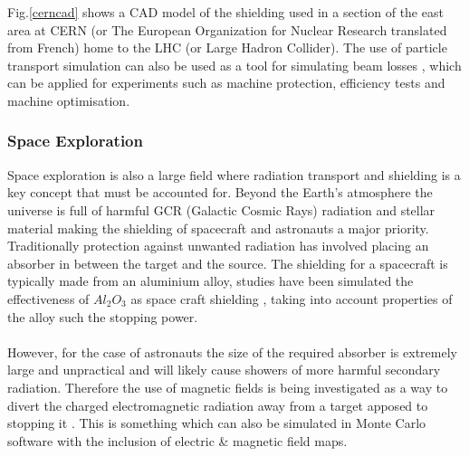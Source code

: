 \documentclass[12pt,a4paper]{article}
\begin{document}
\noindent Fig.\ref{cerncad} shows a CAD model of the shielding used in a section of the east area at CERN (or The European Organization for Nuclear Research translated from French) home to the LHC (or Large Hadron Collider). The use of particle transport simulation can also be used as a tool for simulating beam losses \cite{pyg4om}, which can be applied for experiments such as machine protection, efficiency tests and machine optimisation.

\subsubsection{Space Exploration}
\noindent Space exploration is also a large field where radiation transport and shielding is a key concept that must be accounted for. Beyond the Earth's atmosphere the universe is full of harmful GCR (Galactic Cosmic Rays) radiation and stellar material making the shielding of spacecraft and astronauts a major priority. Traditionally protection against unwanted radiation has involved placing an absorber in between the target and the source. The shielding for a spacecraft is typically made from an aluminium alloy, studies have been simulated the effectiveness of $Al_2O_3$ as space craft shielding \cite{spacesh}, taking into account properties of the alloy such the stopping power. 
\\\\
\noindent However, for the case of astronauts the size of the required absorber is extremely large and unpractical and will likely cause showers of more harmful secondary radiation. Therefore the use of magnetic fields is being investigated as a way to divert the charged electromagnetic radiation away from a target apposed to stopping it \cite{magf}. This is something which can also be simulated in Monte Carlo software with the inclusion of electric \& magnetic field maps.
\end{document}

